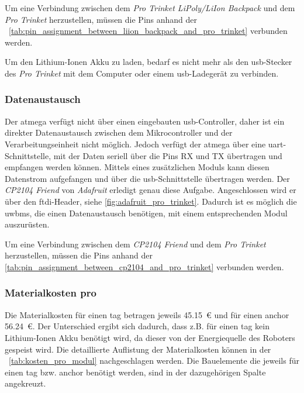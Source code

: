 Um eine Verbindung zwischen dem \textit{Pro Trinket LiPoly/LiIon Backpack} und dem \textit{Pro Trinket} herzustellen, müssen die Pins anhand der \tablename~\ref{tab:pin_assignment_between_liion_backpack_and_pro_trinket} verbunden werden.


Um den Lithium-Ionen Akku zu laden, bedarf es nicht mehr als den \Gls{usb}-Stecker des \textit{Pro Trinket} mit dem Computer oder einem \Gls{usb}-Ladegerät zu verbinden.


%
%
\subsubsection{Datenaustausch}

Der \Gls{atmega} verfügt nicht über einen eingebauten \Gls{usb}-Controller, daher ist ein direkter Datenaustausch zwischen dem Mikrocontroller und der Verarbeitungseinheit nicht möglich. Jedoch verfügt der \Gls{atmega} über eine \gls{uart}-Schnittstelle, mit der Daten seriell über die Pins RX und TX übertragen und empfangen werden können. Mittels eines zusätzlichen Moduls kann diesen Datenstrom aufgefangen und über die \Gls{usb}-Schnittstelle übertragen werden. Der \textit{CP2104 Friend} von \textit{Adafruit} erledigt genau diese Aufgabe. Angeschlossen wird er über den \gls{ftdi}-Header, siehe \autoref{fig:adafruit_pro_trinket}. Dadurch ist es möglich die \Glspl{uwbm}, die einen Datenaustausch benötigen, mit einem entsprechenden Modul auszurüsten.

Um eine Verbindung zwischen dem \textit{CP2104 Friend} und dem \textit{Pro Trinket} herzustellen, müssen die Pins anhand der \autoref{tab:pin_assignment_between_cp2104_and_pro_trinket} verbunden werden.


%
%
\subsubsection{Materialkosten pro }

Die Materialkosten für einen \gls{tag} betragen jeweils \SI{45.15}{\euro} und für einen \gls{anchor} \SI{56.24}{\euro}. Der Unterschied ergibt sich dadurch, dass z.B. für einen \gls{tag} kein Lithium-Ionen Akku benötigt wird, da dieser von der Energiequelle des Roboters gespeist wird.
Die detaillierte Auflistung der Materialkosten können in der \tablename~\ref{tab:kosten_pro_modul} nachgeschlagen werden. Die Bauelemente die jeweils für einen \gls{tag} bzw. \gls{anchor} benötigt werden, sind in der dazugehörigen Spalte angekreuzt.


